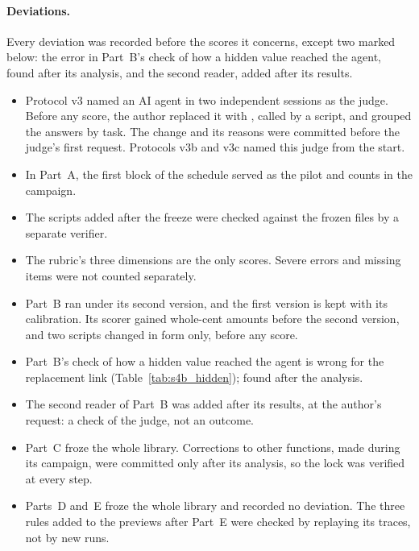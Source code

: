 \paragraph{Deviations.} Every deviation was recorded before the scores it concerns, except two marked below: the
error in Part~B's check of how a hidden value reached the agent, found after its analysis, and the second reader,
added after its results.
\begin{itemize}
\item Protocol v3 named an AI agent in two independent sessions as the judge. Before any score, the author
replaced it with \texttt{\SfourJudge}, called by a script, and grouped the answers by task. The change and its
reasons were committed before the judge's first request. Protocols v3b and v3c named this judge from the start.
\item In Part~A, the first block of the schedule served as the pilot and counts in the campaign.
\item The scripts added after the freeze were checked against the frozen files by a separate verifier.
\item The rubric's three dimensions are the only scores. Severe errors and missing items were not counted
separately.
\item Part~B ran under its second version, and the first version is kept with its calibration. Its scorer gained
whole-cent amounts before the second version, and two scripts changed in form only, before any score.
\item Part~B's check of how a hidden value reached the agent is wrong for the replacement link
(Table~\ref{tab:s4b_hidden}); found after the analysis.
\item The second reader of Part~B was added after its results, at the author's request: a check of the judge,
not an outcome.
\item Part~C froze the whole library. Corrections to other functions, made during its campaign, were committed
only after its analysis, so the lock was verified at every step.
\item Parts~D and~E froze the whole library and recorded no deviation. The three rules added to the previews after
Part~E were checked by replaying its traces, not by new runs.
\end{itemize}
